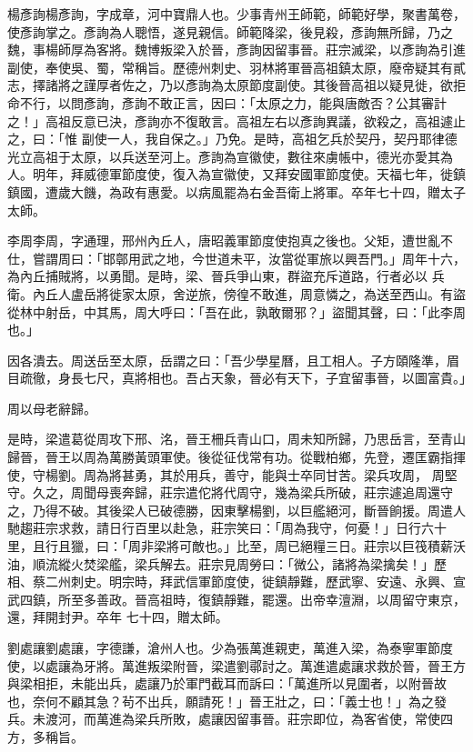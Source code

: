 \begin{pinyinscope}
 楊彥詢楊彥詢，字成章，河中寶鼎人也。少事青州王師範，師範好學，聚書萬卷，使彥詢掌之。彥詢為人聰悟，遂見親信。師範降梁，後見殺，彥詢無所歸，乃之魏，事楊師厚為客將。魏博叛梁入於晉，彥詢因留事晉。莊宗滅梁，以彥詢為引進副使，奉使吳、蜀，常稱旨。歷德州刺史、羽林將軍晉高祖鎮太原，廢帝疑其有貳志，擇諸將之謹厚者佐之，乃以彥詢為太原節度副使。其後晉高祖以疑見徙，欲拒命不行，以問彥詢，彥詢不敢正言，因曰：「太原之力，能與唐敵否？公其審計之！」高祖反意已決，彥詢亦不復敢言。高祖左右以彥詢異議，欲殺之，高祖遽止之，曰：「惟
 副使一人，我自保之。」乃免。是時，高祖乞兵於契丹，契丹耶律德光立高祖于太原，以兵送至河上。彥詢為宣徽使，數往來虜帳中，德光亦愛其為人。明年，拜威德軍節度使，復入為宣徽使，又拜安國軍節度使。天福七年，徙鎮鎮國，遭歲大饑，為政有惠愛。以病風罷為右金吾衛上將軍。卒年七十四，贈太子太師。



 李周李周，字通理，邢州內丘人，唐昭義軍節度使抱真之後也。父矩，遭世亂不仕，嘗謂周曰：「邯鄣用武之地，今世道未平，汝當從軍旅以興吾門。」周年十六，為內丘捕賊將，以勇聞。是時，梁、晉兵爭山東，群盜充斥道路，行者必以
 兵衛。內丘人盧岳將徙家太原，舍逆旅，傍徨不敢進，周意憐之，為送至西山。有盜從林中射岳，中其馬，周大呼曰：「吾在此，孰敢爾邪？」盜聞其聲，曰：「此李周也。」



 因各潰去。周送岳至太原，岳謂之曰：「吾少學星曆，且工相人。子方頤隆準，眉目疏徹，身長七尺，真將相也。吾占天象，晉必有天下，子宜留事晉，以圖富貴。」



 周以母老辭歸。



 是時，梁遣葛從周攻下邢、洺，晉王柵兵青山口，周未知所歸，乃思岳言，至青山歸晉，晉王以周為萬勝黃頭軍使。後從征伐常有功。從戰柏鄉，先登，遷匡霸指揮使，守楊劉。周為將甚勇，其於用兵，善守，能與士卒同甘苦。梁兵攻周，
 周堅守。久之，周聞母喪奔歸，莊宗遣佗將代周守，幾為梁兵所破，莊宗遽追周還守之，乃得不破。其後梁人已破德勝，因東擊楊劉，以巨艦絕河，斷晉餉援。周遣人馳趨莊宗求救，請日行百里以赴急，莊宗笑曰：「周為我守，何憂！」日行六十里，且行且獵，曰：「周非梁將可敵也。」比至，周已絕糧三日。莊宗以巨筏積薪沃油，順流縱火焚梁艦，梁兵解去。莊宗見周勞曰：「微公，諸將為梁擒矣！」歷相、蔡二州刺史。明宗時，拜武信軍節度使，徙鎮靜難，歷武寧、安遠、永興、宣武四鎮，所至多善政。晉高祖時，復鎮靜難，罷還。出帝幸澶淵，以周留守東京，還，拜開封尹。卒年
 七十四，贈太師。



 劉處讓劉處讓，字德謙，滄州人也。少為張萬進親吏，萬進入梁，為泰寧軍節度使，以處讓為牙將。萬進叛梁附晉，梁遣劉鄩討之。萬進遣處讓求救於晉，晉王方與梁相拒，未能出兵，處讓乃於軍門截耳而訴曰：「萬進所以見圍者，以附晉故也，奈何不顧其急？茍不出兵，願請死！」晉王壯之，曰：「義士也！」為之發兵。未渡河，而萬進為梁兵所敗，處讓因留事晉。莊宗即位，為客省使，常使四方，多稱旨。




\end{pinyinscope}
